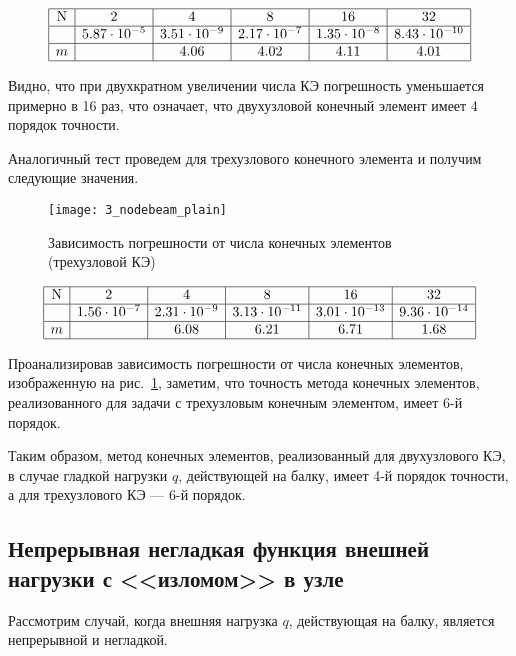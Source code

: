 \documentclass[12pt,a4paper]{article}
\begin{document}
\[
\begin{array}{|c|c|c|c|c|c|}
\hline
\text{N} & 2 & 4 & 8 & 16 & 32 \\ \hline
\Delta  & 5.87 \cdot 10^{-5}  & 3.51 \cdot 10^{-9} & 2.17 \cdot 10^{-7} & 1.35 \cdot 10^{-8} & 8.43 \cdot 10^{-10}\\ \hline
m &  & 4.06 & 4.02 & 4.11 & 4.01 \\ 
\hline
\end{array}
\]

Видно, что при двухкратном увеличении числа КЭ погрешность уменьшается примерно в 16 раз, что означает, что двухузловой конечный элемент имеет 4 порядок точности.

Аналогичный тест проведем для трехузлового конечного элемента и получим следующие значения. 

\begin{figure}[H]
		\centering
		\texttt{[image: 3\_nodebeam\_plain]}
		\caption{Зависимость погрешности от числа конечных элементов (трехузловой КЭ)}
		\label{fig:3_nodebeam_plain}
	\end{figure}
	
\[
\begin{array}{|c|c|c|c|c|c|}
\hline
\text{N} & 2 & 4 & 8 & 16 & 32 \\ \hline
\Delta  & 1.56 \cdot 10^{-7} & 2.31 \cdot 10^{-9} & 3.13 \cdot 10^{-11} & 3.01 \cdot 10^{-13} & 9.36 \cdot 10^{-14} \\ \hline
m &  & 6.08 & 6.21 & 6.71 & 1.68 \\ 
\hline
\end{array}
\]

Проанализировав зависимость погрешности от числа конечных элементов, изображенную на рис.~\ref{fig:3_nodebeam_plain}, заметим, что точность метода конечных элементов, реализованного для задачи с трехузловым конечным элементом, имеет 6-й порядок. 

Таким образом, метод конечных элементов, реализованный для двухузлового КЭ, в случае гладкой нагрузки $q$, действующей на балку, имеет 4-й порядок точности, а для трехузлового КЭ --- 6-й порядок. 



\subsection[Непрерывная негладкая функция внешней нагрузки]{Непрерывная негладкая функция внешней нагрузки с <<изломом>> в узле}

Рассмотрим случай, когда внешняя нагрузка $q$, действующая на балку, является непрерывной и негладкой.
 
\end{document}
